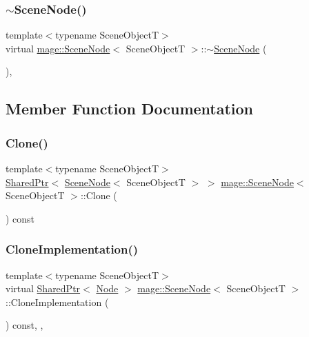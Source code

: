 \subsubsection{\texorpdfstring{$\sim$\+Scene\+Node()}{~SceneNode()}}
{\footnotesize\ttfamily template$<$typename Scene\+ObjectT$>$ \\
virtual \hyperlink{classmage_1_1_scene_node}{mage\+::\+Scene\+Node}$<$ Scene\+ObjectT $>$\+::$\sim$\hyperlink{classmage_1_1_scene_node}{Scene\+Node} (\begin{DoxyParamCaption}{ }\end{DoxyParamCaption})\hspace{0.3cm}{\ttfamily [virtual]}, {\ttfamily [default]}}



\subsection{Member Function Documentation}
\hypertarget{classmage_1_1_scene_node_a5cb20e0955c4afddcf7c2ecf79008e83}{}\label{classmage_1_1_scene_node_a5cb20e0955c4afddcf7c2ecf79008e83} 
\subsubsection{\texorpdfstring{Clone()}{Clone()}}
{\footnotesize\ttfamily template$<$typename Scene\+ObjectT$>$ \\
\hyperlink{namespacemage_a1e01ae66713838a7a67d30e44c67703e}{Shared\+Ptr}$<$ \hyperlink{classmage_1_1_scene_node}{Scene\+Node}$<$ Scene\+ObjectT $>$ $>$ \hyperlink{classmage_1_1_scene_node}{mage\+::\+Scene\+Node}$<$ Scene\+ObjectT $>$\+::Clone (\begin{DoxyParamCaption}{ }\end{DoxyParamCaption}) const}

\hypertarget{classmage_1_1_scene_node_acbbf6e621375c1630b0e1e5ca35e4aec}{}\label{classmage_1_1_scene_node_acbbf6e621375c1630b0e1e5ca35e4aec} 
\subsubsection{\texorpdfstring{Clone\+Implementation()}{CloneImplementation()}}
{\footnotesize\ttfamily template$<$typename Scene\+ObjectT$>$ \\
virtual \hyperlink{namespacemage_a1e01ae66713838a7a67d30e44c67703e}{Shared\+Ptr}$<$ \hyperlink{classmage_1_1_node}{Node} $>$ \hyperlink{classmage_1_1_scene_node}{mage\+::\+Scene\+Node}$<$ Scene\+ObjectT $>$\+::Clone\+Implementation (\begin{DoxyParamCaption}{ }\end{DoxyParamCaption}) const\hspace{0.3cm}{\ttfamily [override]}, {\ttfamily [private]}, {\ttfamily [virtual]}}

